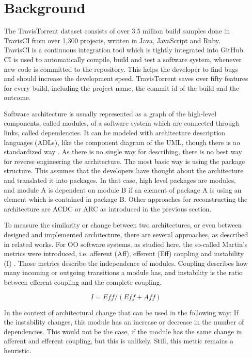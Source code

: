 \documentclass[conference]{IEEEtran}
\begin{document}
\section{Background}

The TravisTorrent dataset \cite{TravisTorrent} consists of over 3.5 million build samples done in TravisCI from over 1,300 projects, written in Java, JavaScript and Ruby. TravisCI is a continuous integration tool which is tightly integrated into GitHub. CI is used to automatically compile, build and test a software system, whenever new code is committed to the repository. This helps the developer to find bugs and should increase the development speed. 
TravisTorrent saves over fifty features for every build, including the project name, the commit id of the build and the outcome.

Software architecture is usually represented as a graph of the high-level components, called modules, of a software system which are connected through links, called dependencies. It can be modeled with architecture description languages (ADLs), like the component diagram of the UML, though there is no standardized way \cite{UML-Arch}. 
As there is no single way for describing, there is no best way for reverse engineering the architecture. The most basic way is using the package structure. This assumes that the developers have thought about the architecture and translated it into packages. In that case, high level packages are modules, and module A is dependent on module B if an element of package A is using an element which is contained in package B.
Other approaches for reconstructing the architecture are ACDC or ARC as introduced in the previous section.

To measure the similarity or change between two architectures, or even between designed and implemented architecture, there are several approaches, as described in related works. For OO software systems, as studied here, the so-called Martin's metrics \cite{martinsMetrics} were introduced, i.e. afferent (Aff), efferent (Eff) coupling and instability (I) . Those metrics describe the independence of modules. Coupling describes how many incoming or outgoing transitions a module has, and instability is the ratio between efferent coupling and the complete coupling. 

\begin{equation} \label{eq:inst}
I = \textit{Eff} / (\textit{Eff} + \textit{Aff})
\end{equation}

In the context of architectural change that can be used in the following way: If the instability changes, this module has an increase or decrease in the number of dependencies. This would not be the case, if the module has the same change in afferent and efferent coupling, but this is unlikely. Still, this metric remains a heuristic.
\end{document}
